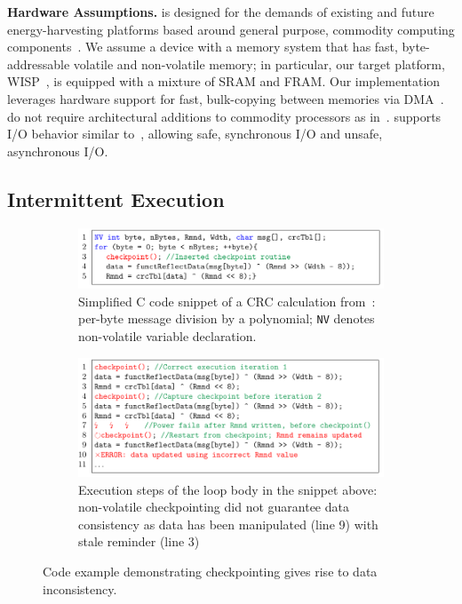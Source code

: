 \textbf{Hardware Assumptions.} \sys is designed for the demands of existing and
future energy-harvesting platforms based around general purpose, commodity
computing components~\cite{wisp,msp430datasheet}. We assume a device with a
memory system that has fast, byte-addressable volatile and non-volatile memory;
in particular, our target platform, WISP~\cite{wisp}, is equipped with a
mixture of SRAM and FRAM. Our implementation leverages hardware support for
fast, bulk-copying between memories via DMA~\cite{msp430datasheet}. \sys do not
require architectural additions to commodity processors as
in~\cite{su_date_2017,hicks_isca_2017,quickrecall,nvp}. \sys supports I/O
behavior similar to~\cite{alpaca,chain}, allowing safe, synchronous I/O and
unsafe, asynchronous I/O.

\subsection{Intermittent Execution}
\label{sec:background_consistency}

\begin{figure}
	\begin{subfigure}[t]{\linewidth}
		\centering \includegraphics[width=\columnwidth]{figures/crc_example}
		\caption{Simplified C code snippet of a CRC calculation from~\cite{hicks_mibench2_2016}: per-byte message division by a polynomial; \texttt{NV} denotes non-volatile variable declaration.}\label{fig:crc_example}
	\end{subfigure}
	\begin{subfigure}[t]{\linewidth}
		\centering \includegraphics[width=\columnwidth]{figures/crc_example_war}
		\caption{Execution steps of the loop body in the snippet above: non-volatile checkpointing did not guarantee data consistency as data has been manipulated (line 9) with stale reminder (line 3)}\label{fig:crc_example_war}
	\end{subfigure}
	\caption{Code example demonstrating checkpointing gives rise to data inconsistency.}\label{fig:code_demo_incosistency}
\end{figure}

